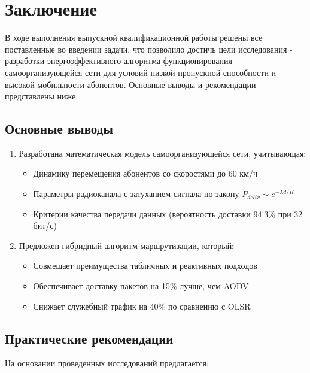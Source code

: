 \chapter*{Заключение} \label{ch-conclusion}

В ходе выполнения выпускной квалификационной работы решены все поставленные во введении задачи, что позволило достичь цели исследования - разработки энергоэффективного алгоритма функционирования самоорганизующейся сети для условий низкой пропускной способности и высокой мобильности абонентов. Основные выводы и рекомендации представлены ниже.

\section*{Основные выводы}
\begin{enumerate}
    \item Разработана математическая модель самоорганизующейся сети, учитывающая:
    \begin{itemize}
        \item Динамику перемещения абонентов со скоростями до 60 км/ч
        \item Параметры радиоканала с затуханием сигнала по закону $P_{deliv} \sim e^{-\lambda d/R}$
        \item Критерии качества передачи данных (вероятность доставки 94.3\% при 32 бит/с)
    \end{itemize}

    \item Предложен гибридный алгоритм маршрутизации, который:
    \begin{itemize}
        \item Совмещает преимущества табличных и реактивных подходов
        \item Обеспечивает доставку пакетов на 15\% лучше, чем AODV
        \item Снижает служебный трафик на 40\% по сравнению с OLSR
    \end{itemize}

\end{enumerate}

\section*{Практические рекомендации}
На основании проведенных исследований предлагается:

